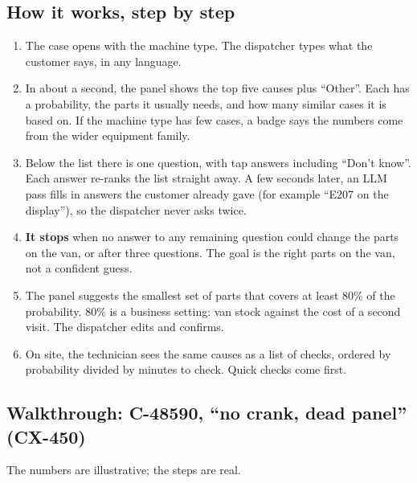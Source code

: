 \documentclass[11pt,a4paper]{article}
\begin{document}
\subsection{How it works, step by step}

\begin{enumerate}
  \item The case opens with the machine type. The dispatcher types what the customer says, in any language.
  \item In about a second, the panel shows the top five causes plus “Other”. Each has a probability, the parts it usually needs, and how many similar cases it is based on. If the machine type has few cases, a badge says the numbers come from the wider equipment family.
  \item Below the list there is one question, with tap answers including “Don't know”. Each answer re-ranks the list straight away. A few seconds later, an LLM pass fills in answers the customer already gave (for example “E207 on the display”), so the dispatcher never asks twice.
  \item \textbf{It stops} when no answer to any remaining question could change the parts on the van, or after three questions. The goal is the right parts on the van, not a confident guess.
  \item The panel suggests the smallest set of parts that covers at least 80\% of the probability. 80\% is a business setting: van stock against the cost of a second visit. The dispatcher edits and confirms.
  \item On site, the technician sees the same causes as a list of checks, ordered by probability divided by minutes to check. Quick checks come first.
\end{enumerate}

\subsection{Walkthrough: C-48590, “no crank, dead panel” (CX-450)}

The numbers are illustrative; the steps are real.
\end{document}
